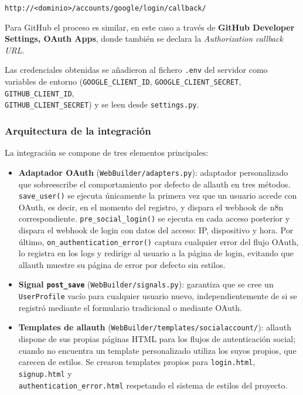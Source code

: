\begin{center}
    \texttt{http://\textless{}dominio\textgreater{}/accounts/google/login/callback/}
\end{center}

Para GitHub el proceso es similar, en este caso a través de \textbf{GitHub Developer Settings, OAuth Apps}, donde también se declara la \emph{Authorization callback URL}.

Las credenciales obtenidas se añadieron al fichero \texttt{.env} del servidor como variables de entorno (\texttt{GOOGLE\_CLIENT\_ID}, \texttt{GOOGLE\_CLIENT\_SECRET}, \texttt{GITHUB\_CLIENT\_ID}, \\ \texttt{GITHUB\_CLIENT\_SECRET}) y se leen desde \texttt{settings.py}.


\subsubsection{Arquitectura de la integración}
La integración se compone de tres elementos principales:

\begin{itemize}
    \item \textbf{Adaptador OAuth} (\texttt{WebBuilder/adapters.py}): adaptador personalizado que sobreescribe el comportamiento por defecto de allauth en tres métodos. \texttt{save\_user()} se ejecuta únicamente la primera vez que un usuario accede con OAuth, es decir, en el momento del registro, y dispara el webhook de n8n correspondiente. \texttt{pre\_social\_login()} se ejecuta en cada acceso posterior y dispara el webhook de login con datos del acceso: IP, dispositivo y hora. Por último, \texttt{on\_authentication\_error()} captura cualquier error del flujo OAuth, lo registra en los logs y redirige al usuario a la página de login, evitando que allauth muestre su página de error por defecto sin estilos.

    \item \textbf{Signal \texttt{post\_save}} (\texttt{WebBuilder/signals.py}): garantiza que se cree un \\ \texttt{UserProfile} vacío para cualquier usuario nuevo, independientemente de si se registró mediante el formulario tradicional o mediante OAuth.

    \item \textbf{Templates de allauth} (\texttt{WebBuilder/templates/socialaccount/}): allauth dispone de sus propias páginas HTML para los flujos de autenticación social; cuando no encuentra un template personalizado utiliza los suyos propios, que carecen de estilos. Se crearon templates propios para \texttt{login.html}, \texttt{signup.html} y \\ \texttt{authentication\_error.html} respetando el sistema de estilos del proyecto.
\end{itemize}


